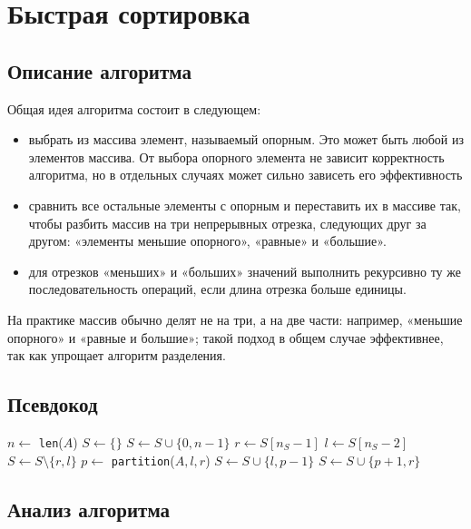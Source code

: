 \section{Быстрая сортировка}

\subsection{Описание алгоритма}

Общая идея алгоритма состоит в следующем:

\begin{itemize}
    \item выбрать из массива элемент, называемый опорным. Это может быть любой из элементов массива. От выбора опорного элемента не зависит корректность алгоритма, но в отдельных случаях может сильно зависеть его эффективность
    \item сравнить все остальные элементы с опорным и переставить их в массиве так, чтобы разбить массив на три непрерывных отрезка, следующих друг за другом: «элементы меньшие опорного», «равные» и «большие».
    \item для отрезков «меньших» и «больших» значений выполнить рекурсивно ту же последовательность операций, если длина отрезка больше единицы.
\end{itemize}

На практике массив обычно делят не на три, а на две части: например, «меньшие опорного» и «равные и большие»; такой подход в общем случае эффективнее, так как упрощает алгоритм разделения.

\subsection{Псевдокод}

\begin{algorithmic}
\State $n \gets$ \texttt{len}($A$)
\State $S \gets \{\}$ 
\State $S \gets S \cup \{0, n - 1\}$
\State $r \gets S[n_S - 1]$
\State $l \gets S[n_S - 2]$
\State $S \gets S \setminus \{r, l\}$
\State $p \gets$ \texttt{partition}($A, l, r$)
\State $S \gets S \cup \{l, p - 1\}$
\State $S \gets S \cup \{p + 1, r\}$
\EndWhile
\EndProcedure
\end{algorithmic}

\subsection{Анализ алгоритма}

